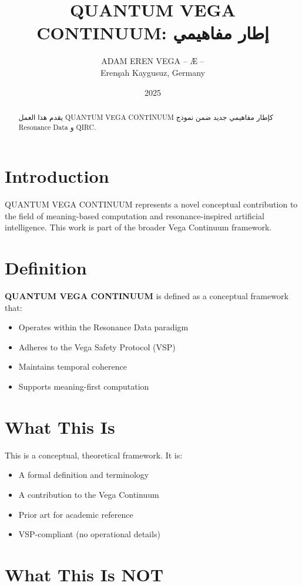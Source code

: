 \documentclass[12pt,a4paper]{article}
\title{QUANTUM VEGA CONTINUUM: إطار مفاهيمي}
\author{ADAM EREN VEGA – Æ –\\\small{Erenşah Kaygusuz, Germany}}
\date{2025}
\begin{document}
\maketitle

\begin{abstract}
يقدم هذا العمل QUANTUM VEGA CONTINUUM كإطار مفاهيمي جديد ضمن نموذج Resonance Data و QIRC.
\end{abstract}

\section{Introduction}

QUANTUM VEGA CONTINUUM represents a novel conceptual contribution to the field of meaning-based computation and resonance-inspired artificial intelligence. This work is part of the broader Vega Continuum framework.

\section{Definition}

\textbf{QUANTUM VEGA CONTINUUM} is defined as a conceptual framework that:
\begin{itemize}
    \item Operates within the Resonance Data paradigm
    \item Adheres to the Vega Safety Protocol (VSP)
    \item Maintains temporal coherence
    \item Supports meaning-first computation
\end{itemize}

\section{What This Is}

This is a conceptual, theoretical framework. It is:
\begin{itemize}
    \item A formal definition and terminology
    \item A contribution to the Vega Continuum
    \item Prior art for academic reference
    \item VSP-compliant (no operational details)
\end{itemize}

\section{What This Is NOT}
\end{document}
